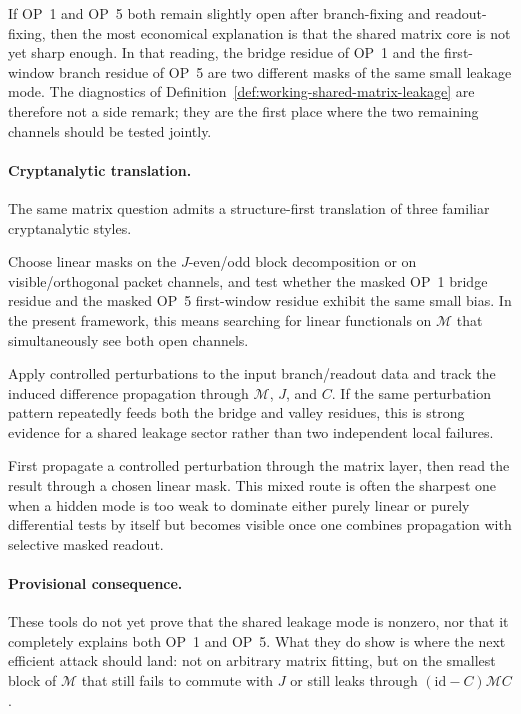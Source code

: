 \begin{remark}
\label{rem:working-op1-op5-coupling-heuristic}
If OP~1 and OP~5 both remain slightly open after branch-fixing and readout-fixing, then the most economical explanation is that the shared matrix core is not yet sharp enough. In that reading, the bridge residue of OP~1 and the first-window branch residue of OP~5 are two different masks of the same small leakage mode. The diagnostics of Definition~\ref{def:working-shared-matrix-leakage} are therefore not a side remark; they are the first place where the two remaining channels should be tested jointly.
\end{remark}

\paragraph{Cryptanalytic translation.}\label{par:working-cryptanalytic-translation}
The same matrix question admits a structure-first translation of three familiar cryptanalytic styles.
\begin{description}[leftmargin=2.2em, labelindent=0pt, itemsep=0.5em]
  \item[Linear route.] Choose linear masks on the \(J\)-even/odd block decomposition or on visible/orthogonal packet channels, and test whether the masked OP~1 bridge residue and the masked OP~5 first-window residue exhibit the same small bias. In the present framework, this means searching for linear functionals on \(\mathcal M\) that simultaneously see both open channels.
  \item[Differential route.] Apply controlled perturbations to the input branch/readout data and track the induced difference propagation through \(\mathcal M\), \(J\), and \(C\). If the same perturbation pattern repeatedly feeds both the bridge and valley residues, this is strong evidence for a shared leakage sector rather than two independent local failures.
  \item[Linear-differential route.] First propagate a controlled perturbation through the matrix layer, then read the result through a chosen linear mask. This mixed route is often the sharpest one when a hidden mode is too weak to dominate either purely linear or purely differential tests by itself but becomes visible once one combines propagation with selective masked readout.
\end{description}

\paragraph{Provisional consequence.}
These tools do not yet prove that the shared leakage mode is nonzero, nor that it completely explains both OP~1 and OP~5. What they do show is where the next efficient attack should land: not on arbitrary matrix fitting, but on the smallest block of \(\mathcal M\) that still fails to commute with \(J\) or still leaks through \((\mathrm{id}-C)\mathcal M C\).

